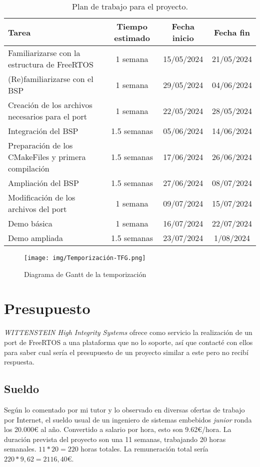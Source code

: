 \begin{table}[h!]
\centering
\begin{tabularx}{\textwidth}{|X|c|c|c|}
\hline
\textbf{Tarea} & \textbf{Tiempo estimado} & \textbf{Fecha inicio} & \textbf{Fecha fin} \\ \hline
Familiarizarse con la estructura de FreeRTOS & 1 semana & 15/05/2024 & 21/05/2024 \\ \hline
(Re)familiarizarse con el BSP & 1 semana & 29/05/2024 & 04/06/2024 \\ \hline
Creación de los archivos necesarios para el port & 1 semana & 22/05/2024 & 28/05/2024 \\ \hline
Integración del BSP & 1.5 semanas & 05/06/2024 & 14/06/2024 \\ \hline
Preparación de los CMakeFiles y primera compilación & 1.5 semanas & 17/06/2024 & 26/06/2024 \\ \hline
Ampliación del BSP & 1.5 semanas & 27/06/2024 & 08/07/2024 \\ \hline
Modificación de los archivos del port & 1 semana & 09/07/2024 & 15/07/2024 \\ \hline
Demo básica & 1 semana & 16/07/2024 & 22/07/2024 \\ \hline
Demo ampliada & 1.5 semanas & 23/07/2024 & 1/08/2024 \\ \hline
\end{tabularx}
\caption{Plan de trabajo para el proyecto.}
\label{tabla:plan_trabajo}
\end{table}

\begin{figure}[!ht]
\centering
\texttt{[image: img/Temporización-TFG.png]}
\caption{Diagrama de Gantt de la temporización}
\label{fig:Gantt_1}
\end{figure}

\section{Presupuesto}
\emph{WITTENSTEIN High Integrity Systems} ofrece como servicio la realización de un port de FreeRTOS a una plataforma que no lo soporte, así que contacté con ellos para saber cual sería el presupuesto de un proyecto similar a este pero no recibí respuesta.

\subsection{Sueldo}
Según lo comentado por mi tutor y lo observado en diversas ofertas de trabajo por Internet, el sueldo usual de un ingeniero de sistemas embebidos \emph{junior} ronda los 20.000€ al año. Convertido a salario por hora, esto son 9.62€/hora. La duración prevista del proyecto son una 11 semanas, trabajando 20 horas semanales. $11 * 20 = 220$ horas totales. La remuneración total sería $220 * 9,62 = 2116,40$€.

